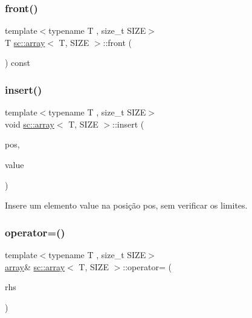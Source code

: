 \mbox{\label{classsc_1_1array_a417d396dd4eb592ee3fc22ec347ef30b}} 
\subsubsection{\texorpdfstring{front()}{front()}}
{\footnotesize\ttfamily template$<$typename T , size\+\_\+t S\+I\+ZE$>$ \\
T \hyperlink{classsc_1_1array}{sc\+::array}$<$ T, S\+I\+ZE $>$\+::front (\begin{DoxyParamCaption}\item[{void}]{ }\end{DoxyParamCaption}) const\hspace{0.3cm}{\ttfamily [inline]}}

\mbox{\label{classsc_1_1array_ad17dd82a32680d0fae3cb6922bb57150}} 
\subsubsection{\texorpdfstring{insert()}{insert()}}
{\footnotesize\ttfamily template$<$typename T , size\+\_\+t S\+I\+ZE$>$ \\
void \hyperlink{classsc_1_1array}{sc\+::array}$<$ T, S\+I\+ZE $>$\+::insert (\begin{DoxyParamCaption}\item[{size\+\_\+t}]{pos,  }\item[{const T \&}]{value }\end{DoxyParamCaption})\hspace{0.3cm}{\ttfamily [inline]}}



Insere um elemento \textquotesingle{}value\textquotesingle{} na posição \textquotesingle{}pos\textquotesingle{}, sem verificar os limites. 

\mbox{\label{classsc_1_1array_acc56f3049e57cc6cddb56ab544319a56}} 
\subsubsection{\texorpdfstring{operator=()}{operator=()}}
{\footnotesize\ttfamily template$<$typename T , size\+\_\+t S\+I\+ZE$>$ \\
\hyperlink{classsc_1_1array}{array}\& \hyperlink{classsc_1_1array}{sc\+::array}$<$ T, S\+I\+ZE $>$\+::operator= (\begin{DoxyParamCaption}\item[{const \hyperlink{classsc_1_1array}{array}$<$ T, S\+I\+ZE $>$ \&}]{rhs }\end{DoxyParamCaption})\hspace{0.3cm}{\ttfamily [inline]}}

